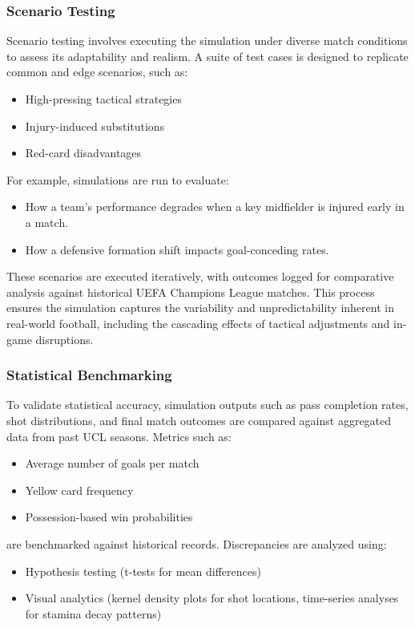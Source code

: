 \documentclass[12pt]{article}
\begin{document}
\subsubsection{Scenario Testing}
Scenario testing involves executing the simulation under diverse match conditions to assess its adaptability and realism. A suite of test cases is designed to replicate common and edge scenarios, such as:

\begin{itemize}
    \item High-pressing tactical strategies
    \item Injury-induced substitutions
    \item Red-card disadvantages
\end{itemize}

For example, simulations are run to evaluate:
\begin{itemize}
    \item How a team's performance degrades when a key midfielder is injured early in a match.
    \item How a defensive formation shift impacts goal-conceding rates.
\end{itemize}

These scenarios are executed iteratively, with outcomes logged for comparative analysis against historical UEFA Champions League matches. This process ensures the simulation captures the variability and unpredictability inherent in real-world football, including the cascading effects of tactical adjustments and in-game disruptions.

\subsubsection{Statistical Benchmarking}
To validate statistical accuracy, simulation outputs such as pass completion rates, shot distributions, and final match outcomes are compared against aggregated data from past UCL seasons. Metrics such as:
\begin{itemize}
    \item Average number of goals per match
    \item Yellow card frequency
    \item Possession-based win probabilities
\end{itemize}

are benchmarked against historical records. Discrepancies are analyzed using:
\begin{itemize}
    \item Hypothesis testing (t-tests for mean differences)
    \item Visual analytics (kernel density plots for shot locations, time-series analyses for stamina decay patterns)
\end{itemize}
\end{document}
